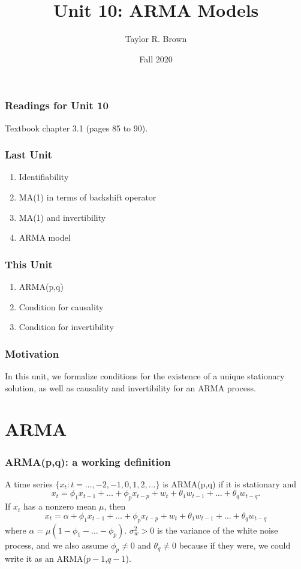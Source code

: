 \documentclass[%
xcolor=pdftex]{beamer}
\title{Unit 10: ARMA Models}
\author[STAT 5170: Applied Time Series, Unit 10]{Taylor R. Brown}
\institute{Department of Statistics, University of Virginia}
\date{Fall 2020}
\begin{document}
\frame{\titlepage}


\begin{frame}
\frametitle{Readings for Unit 10}

Textbook chapter 3.1 (pages 85 to 90).

\end{frame}



\begin{frame}
\frametitle{Last Unit}
\begin{enumerate}
\item Identifiability
\item MA(1) in terms of backshift operator
\item MA(1) and invertibility
\item ARMA model
\end{enumerate}
\end{frame}

\begin{frame}
\frametitle{This Unit}
\begin{enumerate}
\item ARMA(p,q)
\item Condition for causality
\item Condition for invertibility
\end{enumerate}
\end{frame}


\begin{frame}
\frametitle{Motivation}

In this unit, we formalize conditions for the existence of a unique stationary solution, as well as causality and invertibility for an ARMA process.

\end{frame}

\section{ARMA}
\frame{\tableofcontents[currentsection]}

\begin{frame}
\frametitle{ARMA(p,q): a working definition}

A time series $\{x_t: t=\ldots,-2,-1,0,1,2,\ldots\}$ is ARMA(p,q) if it is stationary and
\begin{equation*}
x_t=\phi_1 x_{t-1}+\ldots+\phi_p x_{t-p}+w_t+\theta_1 w_{t-1}+\ldots+\theta_q w_{t-q}.
\end{equation*}
If $x_t$ has a nonzero mean $\mu$, then
$$
x_t=\alpha + \phi_1 x_{t-1}+\ldots+\phi_p x_{t-p}+w_t+\theta_1 w_{t-1}+\ldots+\theta_q w_{t-q}
$$
where $\alpha=\mu(1-\phi_1-\ldots-\phi_p)$. $\sigma^2_w > 0$ is the variance of the white noise process, and we also assume $\phi_p \neq 0$ and $\theta_q \neq 0$ because if they were, we could write it as an ARMA($p-1$,$q-1$).

\end{frame}
\end{document}
